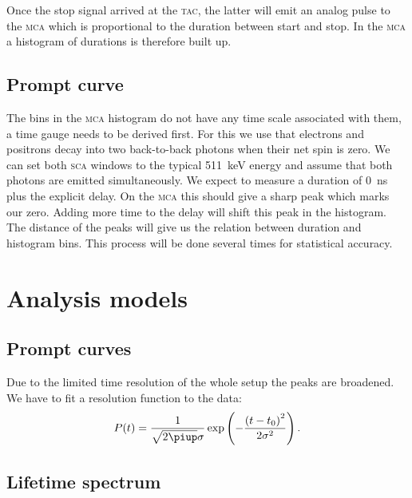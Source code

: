 \documentclass[11pt, english, fleqn, DIV=15, headinclude, BCOR=2cm]{scrreprt}
\begin{document}
Once the stop signal arrived at the \textsc{tac}, the latter will emit an analog pulse
to the \textsc{mca} which is proportional to the duration between start and stop. In the
\textsc{mca} a histogram of durations is therefore built up.

\subsection{Prompt curve}

The bins in the \textsc{mca} histogram do not have any time scale associated with them,
a time gauge needs to be derived first. For this we use that electrons and
positrons decay into two back-to-back photons when their net spin is zero. We
can set both \textsc{sca} windows to the typical \SI{511}{\kilo\electronvolt} energy and
assume that both photons are emitted simultaneously. We expect to measure a
duration of \SI{0}{\nano\second} plus the explicit delay. On the \textsc{mca} this
should give a sharp peak which marks our zero. Adding more time to the delay
will shift this peak in the histogram. The distance of the peaks will give us
the relation between duration and histogram bins. This process will be done
several times for statistical accuracy.

\section{Analysis models}

\subsection{Prompt curves}

Due to the limited time resolution of the whole setup the peaks are broadened.
We have to fit a resolution function to the data:
\[
P(t) = \frac1{\sqrt{2\piup}\sigma}
        \exp\del{-\frac{\del{t-t_0}^2}{2\sigma^2}}.
\]

\subsection{Lifetime spectrum}
\end{document}
